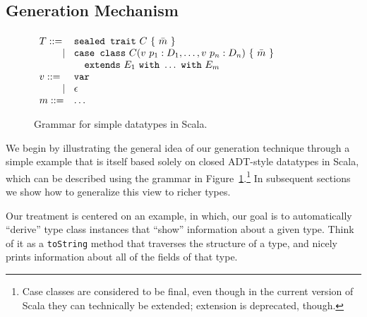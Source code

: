\documentclass[preprint,nocopyrightspace]{sigplanconf}
\newcommand{\gap}{\quad\quad}
\newcommand{\ba}{\begin{array}}
\newcommand{\ea}{\end{array}}
\begin{document}
\subsection{Generation Mechanism}\label{sec:basic-generation}



\begin{figure}
  \centering
$\ba[t]{l@{\hspace{2mm}}l@{\hspace{2mm}}}
T    ::= & \texttt{sealed trait}~C~\{~\bar{m}~\} \\
\gap ~|~ & \texttt{case class}~C(v~p_1: D_1, \ldots, v~p_n: D_n)~\{~\bar{m}~\} \\
\gap     & \texttt{~~extends}~E_1~\texttt{with}~ \ldots ~\texttt{with}~E_m \\
v    ::= & \texttt{var} \\
\gap ~|~ & \epsilon \\
m    ::= & \ldots \\
\ea$
  \caption{Grammar for simple datatypes in Scala.}
  \label{fig:type-syntax}
\end{figure}

We begin by illustrating the general idea of our generation technique through
a simple example that is itself based solely on closed ADT-style datatypes in
Scala, which can be described using the grammar in
Figure~\ref{fig:type-syntax}.\footnote{Case classes are considered to be
final, even though in the current version of Scala they can technically be
extended; extension is deprecated, though.} In subsequent sections we show how
to generalize this view to richer types.

Our treatment is centered on an example, in which, our goal is to
automatically ``derive'' type class instances that ``show'' information about
a given type. Think of it as a \verb|toString| method that traverses the
structure of a type, and nicely prints information about all of the fields of
that type.
\end{document}
